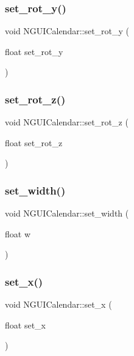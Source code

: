 \subsubsection{\texorpdfstring{set\+\_\+rot\+\_\+y()}{set\_rot\_y()}}
{\footnotesize\ttfamily void N\+G\+U\+I\+Calendar\+::set\+\_\+rot\+\_\+y (\begin{DoxyParamCaption}\item[{float}]{set\+\_\+rot\+\_\+y }\end{DoxyParamCaption})}

\hypertarget{class_n_g_u_i_calendar_a920560b6e5bf0a63c57eba20f19aa4e3}{}\label{class_n_g_u_i_calendar_a920560b6e5bf0a63c57eba20f19aa4e3} 
\subsubsection{\texorpdfstring{set\+\_\+rot\+\_\+z()}{set\_rot\_z()}}
{\footnotesize\ttfamily void N\+G\+U\+I\+Calendar\+::set\+\_\+rot\+\_\+z (\begin{DoxyParamCaption}\item[{float}]{set\+\_\+rot\+\_\+z }\end{DoxyParamCaption})}

\hypertarget{class_n_g_u_i_calendar_a784fcfff08c0f2968c07ca02677f8c01}{}\label{class_n_g_u_i_calendar_a784fcfff08c0f2968c07ca02677f8c01} 
\subsubsection{\texorpdfstring{set\+\_\+width()}{set\_width()}}
{\footnotesize\ttfamily void N\+G\+U\+I\+Calendar\+::set\+\_\+width (\begin{DoxyParamCaption}\item[{float}]{w }\end{DoxyParamCaption})}

\hypertarget{class_n_g_u_i_calendar_a56591ffdf7b13448e22c4ed69109071d}{}\label{class_n_g_u_i_calendar_a56591ffdf7b13448e22c4ed69109071d} 
\subsubsection{\texorpdfstring{set\+\_\+x()}{set\_x()}}
{\footnotesize\ttfamily void N\+G\+U\+I\+Calendar\+::set\+\_\+x (\begin{DoxyParamCaption}\item[{float}]{set\+\_\+x }\end{DoxyParamCaption})}

